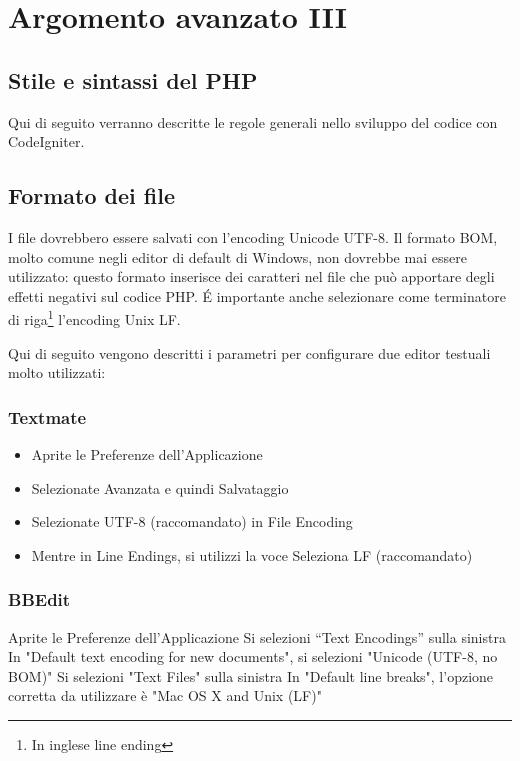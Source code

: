 \chapter{Argomento avanzato III}
\label{cap:stile}

\section{Stile e sintassi del PHP}
Qui di seguito verranno descritte le regole generali nello sviluppo del codice con CodeIgniter.

\section*{Formato dei file}
I file dovrebbero essere salvati con l'encoding Unicode UTF-8. Il formato BOM, molto comune negli editor di default di Windows, non dovrebbe mai essere utilizzato: questo formato inserisce dei caratteri nel file che può apportare degli effetti negativi sul codice PHP. \'E importante anche selezionare come terminatore di riga\footnote{In inglese line ending} l'encoding Unix LF.

Qui di seguito vengono descritti i parametri per configurare due editor testuali molto utilizzati:

\subsection*{Textmate}
\begin{itemize}
\item Aprite le Preferenze dell'Applicazione
\item Selezionate Avanzata e quindi Salvataggio
\item Selezionate UTF-8 (raccomandato) in File Encoding
\item Mentre in Line Endings, si utilizzi la voce Seleziona LF (raccomandato)
\end{itemize}

\subsection*{BBEdit}
Aprite le Preferenze dell'Applicazione
Si selezioni ``Text Encodings'' sulla sinistra
In "Default text encoding for new documents", si selezioni "Unicode (UTF-8, no BOM)"
Si selezioni "Text Files" sulla sinistra
In "Default line breaks", l'opzione corretta da utilizzare è "Mac OS X and Unix (LF)"

